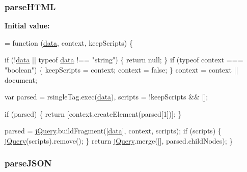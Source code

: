 \subsubsection[{\texorpdfstring{parse\+H\+T\+ML}{parseHTML}}]{ parse\+H\+T\+ML}\hypertarget{jquery-2_82_81-vsdoc_8js_a09aeded1ab567632f194acd1550eac88}{}\label{jquery-2_82_81-vsdoc_8js_a09aeded1ab567632f194acd1550eac88}
{\bfseries Initial value\+:}
\begin{DoxyCode}
= \textcolor{keyword}{function} (\hyperlink{jquery-2_82_81-vsdoc_8js_a609407b3456fdc3c5671a9fc4a226ff7}{data}, context, keepScripts) \{
        

        \textcolor{keywordflow}{if} (!\hyperlink{jquery-2_82_81-vsdoc_8js_a609407b3456fdc3c5671a9fc4a226ff7}{data} || typeof \hyperlink{jquery-2_82_81-vsdoc_8js_a609407b3456fdc3c5671a9fc4a226ff7}{data} !== \textcolor{stringliteral}{"string"}) \{
            \textcolor{keywordflow}{return} null;
        \}
        \textcolor{keywordflow}{if} (typeof context === \textcolor{stringliteral}{"boolean"}) \{
            keepScripts = context;
            context = \textcolor{keyword}{false};
        \}
        context = context || document;

        var parsed = rsingleTag.exec(\hyperlink{jquery-2_82_81-vsdoc_8js_a609407b3456fdc3c5671a9fc4a226ff7}{data}),
            scripts = !keepScripts && [];

        
        \textcolor{keywordflow}{if} (parsed) \{
            \textcolor{keywordflow}{return} [context.createElement(parsed[1])];
        \}

        parsed = \hyperlink{jquery-2_82_81-vsdoc_8js_add5237586d970a38a81f990e8eb28c6c}{jQuery}.buildFragment([\hyperlink{jquery-2_82_81-vsdoc_8js_a609407b3456fdc3c5671a9fc4a226ff7}{data}], context, scripts);
        \textcolor{keywordflow}{if} (scripts) \{
            \hyperlink{jquery-2_82_81-vsdoc_8js_add5237586d970a38a81f990e8eb28c6c}{jQuery}(scripts).remove();
        \}
        \textcolor{keywordflow}{return} \hyperlink{jquery-2_82_81-vsdoc_8js_add5237586d970a38a81f990e8eb28c6c}{jQuery}.merge([], parsed.childNodes);
    \}
\end{DoxyCode}
\subsubsection[{\texorpdfstring{parse\+J\+S\+ON}{parseJSON}}]{ parse\+J\+S\+ON}\hypertarget{jquery-2_82_81-vsdoc_8js_a04f5ac130281955d6ed88ad6456a4e15}{}\label{jquery-2_82_81-vsdoc_8js_a04f5ac130281955d6ed88ad6456a4e15}
